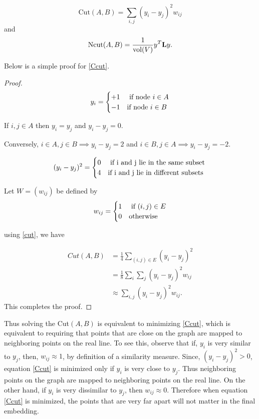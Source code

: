 \begin{Lem}
\begin{equation}\label{Ccut}
\text{Cut$(A,B)$} = \displaystyle{ \sum_{i,j} (y_{i} - y_{j})^{2}w_{ij} }
\end{equation}
and
\begin{equation}\label{Nncut}
\text{Ncut$(A,B)$} = \displaystyle{ \frac{1}{\text{vol}(V)} y^{T}\textbf{L}y}.   
\end{equation}
\end{Lem}
Below is a simple proof for \eqref{Ccut}.
\begin{proof}
\[
 y_{i} =
  \begin{cases} 
      \hfill +1    \hfill & \text{ if node $i \in A$} \\
      \hfill -1 \hfill & \text{if node $i \in B$} \\
  \end{cases}
\]

 If $i, j \in A $ then $y_{i} = y_{j}$ and $y_{i} - y_{j} = 0.$

 Conversely, $i \in A, j \in B \implies y_{i} - y_{j} = 2$ and $i \in B, j \in A \implies y_{i}-y_{j} = -2.$


\[
 (y_{i} - y_{j})^{2} =
  \begin{cases} 
      \hfill 0    \hfill & \text{ if i and j lie in the same subset} \\
      \hfill 4 \hfill & \text{if  i and j lie in different subsets } \\
  \end{cases}
\]

Let  $W = (w_{ij})$ be defined by
\[
 w_{ij} =
  \begin{cases} 
      \hfill 1   \hfill & \text{ if $ (i, j) \in E$} \\
      \hfill 0 \hfill & \text{otherwise} \\
  \end{cases}
\]

using \eqref{cut}, we have

\begin{align*}
Cut(A, B) &= \frac{1}{4} \sum_{(i, j) \in E} (y_{i} - y_{j})^{2}  \\
& =  \frac{1}{8} \sum_{i} \sum_{j} (y_{i}-y_{j})^{2}w_{ij} \\
& \approx  \sum_{i,j} (y_{i} - y_{j})^{2}w_{ij}.
\end{align*}
This completes the proof.
\end{proof}

Thus solving the Cut$(A,B)$ is equivalent to minimizing \eqref{Ccut},
which is equivalent to requiring that points that are close on the graph are mapped to neighboring points on the real line.
To see this, observe that if, $y_{i}$ is very similar to $y_{j}$, then, $w_{ij} \approx 1$, by definition of a similarity measure. Since, $(y_{i}-y_{j})^2 > 0$, equation \eqref{Ccut} is minimized only if $y_{i}$ is very close to $y_{j}$. Thus neighboring points on the graph are mapped to neighboring points on the real line. On the other hand, if $y_{i}$ is very dissimilar to $y_{j}$, then $w_{ij} \approx 0$. Therefore when equation  \eqref{Ccut} is minimized,
the points that are very far apart will not matter in the final embedding.

